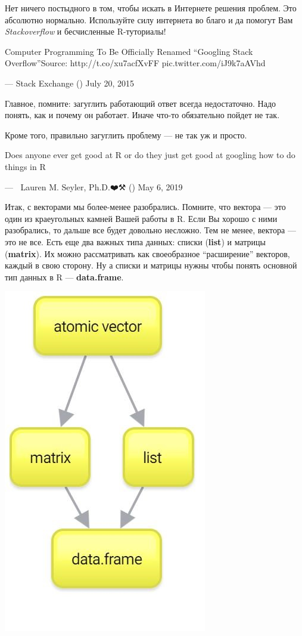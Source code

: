 \documentclass[]{book}
\begin{document}
Нет ничего постыдного в том, чтобы искать в Интернете решения проблем. Это абсолютно нормально. Используйте силу интернета во благо и да помогут Вам \emph{Stackoverflow} и бесчисленные R-туториалы!

Computer Programming To Be Officially Renamed ``Googling Stack Overflow''Source: http://t.co/xu7acfXvFF pic.twitter.com/iJ9k7aAVhd

--- Stack Exchange (\citet{StackExchange}) July 20, 2015

Главное, помните: загуглить работающий ответ всегда недостаточно. Надо понять, как и почему он работает. Иначе что-то обязательно пойдет не так.

Кроме того, правильно загуглить проблему --- не так уж и просто.

Does anyone ever get good at R or do they just get good at googling how to do things in R

--- 🔬🖤Lauren M. Seyler, Ph.D.❤️⚒ (\citet{mousquemere}) May 6, 2019

Итак, с векторами мы более-менее разобрались. Помните, что вектора --- это один из краеугольных камней Вашей работы в R. Если Вы хорошо с ними разобрались, то дальше все будет довольно несложно. Тем не менее, вектора --- это не все. Есть еще два важных типа данных: списки (\textbf{list}) и матрицы (\textbf{matrix}). Их можно рассматривать как своеобразное ``расширение'' векторов, каждый в свою сторону. Ну а списки и матрицы нужны чтобы понять основной тип данных в R --- \textbf{data.frame}.

\includegraphics{images/New-Mind-Map.jpg}
\end{document}
